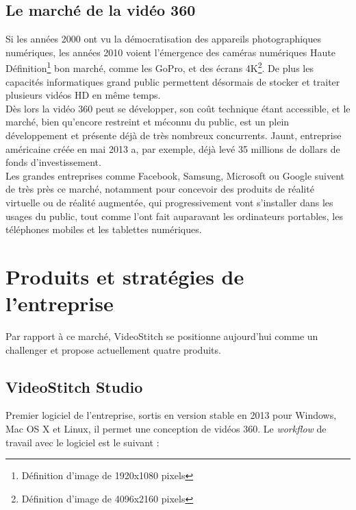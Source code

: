 \subsection{Le marché de la vidéo 360}
Si les années 2000 ont vu la démocratisation des appareils photographiques numériques,
les années 2010 voient l'émergence des caméras numériques Haute 
Définition\footnote{Définition d'image de 1920x1080 pixels} bon marché, comme les GoPro,
et des écrans 4K\footnote{Définition d'image de 4096x2160 pixels}. De plus les capacités
informatiques grand public permettent désormais de stocker et traiter plusieurs 
vidéos HD en même temps.\\
Dès lors la vidéo 360 peut se développer, son coût technique
étant accessible, et le marché, bien qu'encore restreint et méconnu du public,
est un plein développement et présente déjà de très nombreux concurrents. Jaunt,
entreprise américaine créée en mai 2013 a, par exemple, déjà levé 35 millions
de dollars de fonds d'investissement\cite{jaunt-fundings}.\\
Les grandes entreprises comme Facebook\cite{facebook-vr}, Samsung\cite{samsung-vr}, 
Microsoft\cite{microsoft-vr} ou Google\cite{google-vr} suivent de
très près ce marché, notamment pour concevoir des produits de réalité virtuelle 
ou de réalité augmentée, qui progressivement vont s'installer dans les usages
du public, tout comme l'ont fait auparavant les ordinateurs portables, les téléphones mobiles
et les tablettes numériques.\\

\section{Produits et stratégies de l'entreprise}
Par rapport à ce marché, VideoStitch se positionne aujourd'hui comme un challenger
et propose actuellement quatre produits\cite{videostitch-products}.
\subsection{VideoStitch Studio}
\label{videostitch-studio-section}
\label{videostitch-studio}
Premier logiciel de l'entreprise, sortis en version stable en 2013 pour Windows, Mac OS X et Linux,
il permet une conception de vidéos 360. Le \textit{workflow} de travail avec le logiciel est le suivant : 

